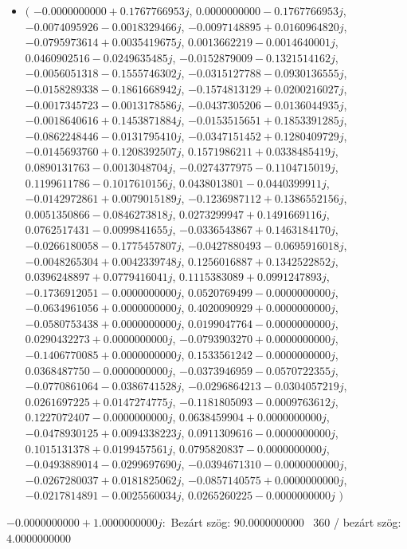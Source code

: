 \documentclass[14pt,a4paper]{article}
\begin{document}
\begin{itemize}
\item
$\big($
$-0.0000000000+0.1767766953j$, $0.0000000000-0.1767766953j$, $-0.0074095926-0.0018329466j$, $-0.0097148895+0.0160964820j$, $-0.0795973614+0.0035419675j$, $0.0013662219-0.0014640001j$, $0.0460902516-0.0249635485j$, $-0.0152879009-0.1321514162j$, $-0.0056051318-0.1555746302j$, $-0.0315127788-0.0930136555j$, $-0.0158289338-0.1861668942j$, $-0.1574813129+0.0200216027j$, $-0.0017345723-0.0013178586j$, $-0.0437305206-0.0136044935j$, $-0.0018640616+0.1453871884j$, $-0.0153515651+0.1853391285j$, $-0.0862248446-0.0131795410j$, $-0.0347151452+0.1280409729j$, $-0.0145693760+0.1208392507j$, $0.1571986211+0.0338485419j$, $0.0890131763-0.0013048704j$, $-0.0274377975-0.1104715019j$, $0.1199611786-0.1017610156j$, $0.0438013801-0.0440399911j$, $-0.0142972861+0.0079015189j$, $-0.1236987112+0.1386552156j$, $0.0051350866-0.0846273818j$, $0.0273299947+0.1491669116j$, $0.0762517431-0.0099841655j$, $-0.0336543867+0.1463184170j$, $-0.0266180058-0.1775457807j$, $-0.0427880493-0.0695916018j$, $-0.0048265304+0.0042339748j$, $0.1256016887+0.1342522852j$, $0.0396248897+0.0779416041j$, $0.1115383089+0.0991247893j$, $-0.1736912051-0.0000000000j$, $0.0520769499-0.0000000000j$, $-0.0634961056+0.0000000000j$, $0.4020090929+0.0000000000j$, $-0.0580753438+0.0000000000j$, $0.0199047764-0.0000000000j$, $0.0290432273+0.0000000000j$, $-0.0793903270+0.0000000000j$, $-0.1406770085+0.0000000000j$, $0.1533561242-0.0000000000j$, $0.0368487750-0.0000000000j$, $-0.0373946959-0.0570722355j$, $-0.0770861064-0.0386741528j$, $-0.0296864213-0.0304057219j$, $0.0261697225+0.0147274775j$, $-0.1181805093-0.0009763612j$, $0.1227072407-0.0000000000j$, $0.0638459904+0.0000000000j$, $-0.0478930125+0.0094338223j$, $0.0911309616-0.0000000000j$, $0.1015131378+0.0199457561j$, $0.0795820837-0.0000000000j$, $-0.0493889014-0.0299697690j$, $-0.0394671310-0.0000000000j$, $-0.0267280037+0.0181825062j$, $-0.0857140575+0.0000000000j$, $-0.0217814891-0.0025560034j$, $0.0265260225-0.0000000000j$
$\big)$
\end{itemize}
$-0.0000000000+1.0000000000j$:\
Bezárt szög: $90.0000000000$ \
360 / bezárt szög: $4.0000000000$\
\end{document}
